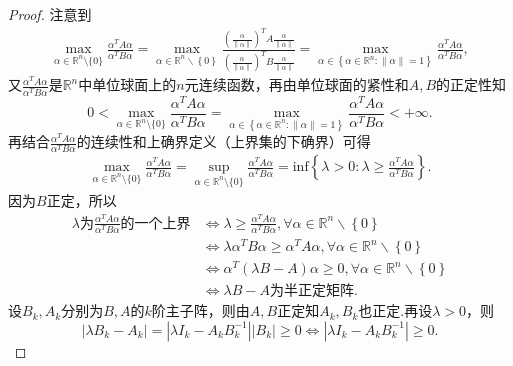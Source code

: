 \documentclass[../../main.tex]{subfiles}
\begin{document}
\begin{proof}
注意到
\begin{align*}
\max_{\alpha \in \mathbb{R} ^n\setminus \{0\}} \frac{\alpha ^TA\alpha}{\alpha ^TB\alpha}=\underset{\alpha \in \mathbb{R} ^n\backslash \left\{ 0 \right\}}{\max}\frac{\left( \frac{\alpha}{\left\| \alpha \right\|} \right) ^TA\frac{\alpha}{\left\| \alpha \right\|}}{\left( \frac{\alpha}{\left\| \alpha \right\|} \right) ^TB\frac{\alpha}{\left\| \alpha \right\|}}=\underset{\alpha \in \left\{ \alpha \in \mathbb{R} ^n:\left\| \alpha \right\| =1 \right\}}{\max}\frac{\alpha ^TA\alpha}{\alpha ^TB\alpha},
\end{align*}
又$\frac{\alpha ^TA\alpha}{\alpha ^TB\alpha}$是$\mathbb{R} ^n$中单位球面上的$n$元连续函数，再由单位球面的紧性和$A,B$的正定性知
$$0<\max_{\alpha \in \mathbb{R} ^n\setminus \{0\}} \frac{\alpha ^TA\alpha}{\alpha ^TB\alpha}=\underset{\alpha \in \left\{ \alpha \in \mathbb{R} ^n:\left\| \alpha \right\| =1 \right\}}{\max}\frac{\alpha ^TA\alpha}{\alpha ^TB\alpha}<+\infty .$$
再结合$\frac{\alpha ^TA\alpha}{\alpha ^TB\alpha}$的连续性和上确界定义（上界集的下确界）可得
\begin{align}
\max_{\alpha \in \mathbb{R} ^n\setminus \{0\}} \frac{\alpha ^TA\alpha}{\alpha ^TB\alpha}=\mathop {\mathrm{sup}} \limits_{\alpha \in \mathbb{R} ^n\setminus \{0\}}\frac{\alpha ^TA\alpha}{\alpha ^TB\alpha}=\mathrm{inf}\left\{ \lambda >0:\lambda \geqslant \frac{\alpha ^TA\alpha}{\alpha ^TB\alpha} \right\}.\label{eq:423rewfj80rj893uf34t5321.1}
\end{align}
因为$B$正定，所以
\begin{align*}
\lambda \text{为}\frac{\alpha ^TA\alpha}{\alpha ^TB\alpha}\text{的一个上界}&\Longleftrightarrow \lambda \geqslant \frac{\alpha ^TA\alpha}{\alpha ^TB\alpha},\forall \alpha \in \mathbb{R} ^n\backslash \left\{ 0 \right\} \\
&\Longleftrightarrow \lambda \alpha ^TB\alpha \geqslant \alpha ^TA\alpha ,\forall \alpha \in \mathbb{R} ^n\backslash \left\{ 0 \right\} \\
&\Longleftrightarrow \alpha ^T\left( \lambda B-A \right) \alpha \geqslant 0,\forall \alpha \in \mathbb{R} ^n\backslash \left\{ 0 \right\} \\
&\Longleftrightarrow \lambda B-A\text{为半正定矩阵}.
\end{align*}
设$B_k,A_k$分别为$B,A$的$k$阶主子阵，则由$A,B$正定知$A_k,B_k$也正定.再设$\lambda >0$，则
$$\left| \lambda B_k-A_k \right|=\left| \lambda I_k-A_kB_{k}^{-1} \right|\left| B_k \right|\geqslant 0\Longleftrightarrow \left| \lambda I_k-A_kB_{k}^{-1} \right|\geqslant 0.$$

\end{proof}
\end{document}
